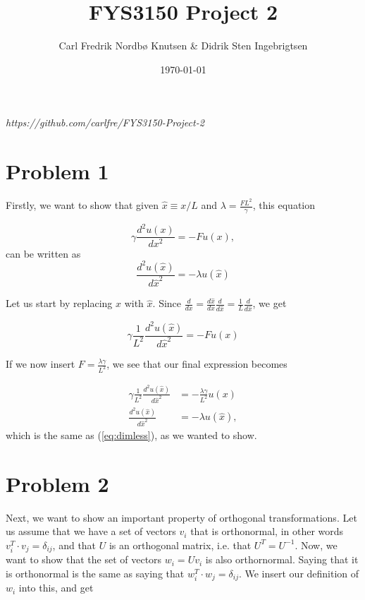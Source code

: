 \documentclass[english,notitlepage]{revtex4-1}  %
\begin{document}
\title{FYS3150 Project 2}      %
\author{Carl Fredrik Nordbø Knutsen \& Didrik Sten Ingebrigtsen}          %
\date{\today}                             %
\noaffiliation                            %


\maketitle 
    
\textit{https://github.com/carlfre/FYS3150-Project-2}
    
\section*{Problem 1}

Firstly, we want to show that given $\hat{x} \equiv x/L$ and $\lambda = \frac{FL^2}{\gamma}$, this equation

\[ \gamma \frac{d^2 u(x)}{dx^2} = -F u(x), \]
can be written as
\begin{equation}
\frac{d^2 u(\hat{x})}{d \hat{x}^2} = - \lambda u(\hat{x})
\label{eq:dimless}
\end{equation}

Let us start by replacing $x$ with $\hat{x}$. Since $\frac{d}{dx} = \frac{d \hat{x}}{dx} \frac{d}{d \hat{x}} = \frac{1}{L} \frac{d}{d \hat{x}}$, we get

\[ \gamma \frac{1}{L^2} \frac{d^2 u(\hat{x})}{d \hat{x}^2} = -F u(x) \]

If we now insert $F = \frac{\lambda \gamma}{L^2}$, we see that our final expression becomes

\begin{align*}
\gamma \frac{1}{L^2} \frac{d^2 u(\hat{x})}{d \hat{x}^2} &= -\frac{\lambda \gamma}{L^2} u(x) \\
\frac{d^2 u(\hat{x})}{d \hat{x}^2} &= - \lambda u(\hat{x}),
\end{align*}
which is the same as (\ref{eq:dimless}), as we wanted to show.

\section*{Problem 2}
Next, we want to show an important property of orthogonal transformations. Let us assume that we have a set of vectors $v_i$ that is orthonormal, in other words $v_i^T \cdot v_j = \delta_{ij}$, and that $U$ is an orthogonal matrix, i.e. that $U^T = U^{-1}$. Now, we want to show that the set of vectors $w_i = U v_i$ is also orthornormal. Saying that it is orthonormal is the same as saying that $w_i^T \cdot w_j = \delta_{ij}$. We insert our definition of $w_i$ into this, and get
\end{document}
